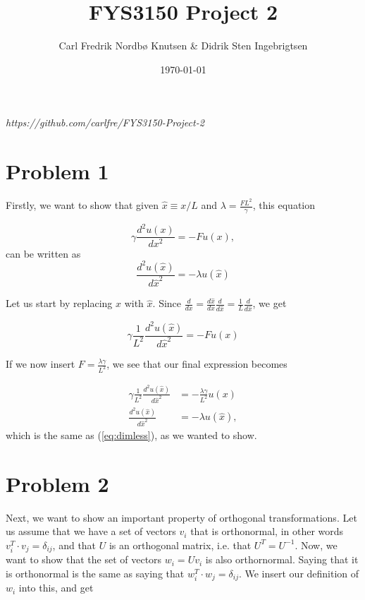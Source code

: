 \documentclass[english,notitlepage]{revtex4-1}  %
\begin{document}
\title{FYS3150 Project 2}      %
\author{Carl Fredrik Nordbø Knutsen \& Didrik Sten Ingebrigtsen}          %
\date{\today}                             %
\noaffiliation                            %


\maketitle 
    
\textit{https://github.com/carlfre/FYS3150-Project-2}
    
\section*{Problem 1}

Firstly, we want to show that given $\hat{x} \equiv x/L$ and $\lambda = \frac{FL^2}{\gamma}$, this equation

\[ \gamma \frac{d^2 u(x)}{dx^2} = -F u(x), \]
can be written as
\begin{equation}
\frac{d^2 u(\hat{x})}{d \hat{x}^2} = - \lambda u(\hat{x})
\label{eq:dimless}
\end{equation}

Let us start by replacing $x$ with $\hat{x}$. Since $\frac{d}{dx} = \frac{d \hat{x}}{dx} \frac{d}{d \hat{x}} = \frac{1}{L} \frac{d}{d \hat{x}}$, we get

\[ \gamma \frac{1}{L^2} \frac{d^2 u(\hat{x})}{d \hat{x}^2} = -F u(x) \]

If we now insert $F = \frac{\lambda \gamma}{L^2}$, we see that our final expression becomes

\begin{align*}
\gamma \frac{1}{L^2} \frac{d^2 u(\hat{x})}{d \hat{x}^2} &= -\frac{\lambda \gamma}{L^2} u(x) \\
\frac{d^2 u(\hat{x})}{d \hat{x}^2} &= - \lambda u(\hat{x}),
\end{align*}
which is the same as (\ref{eq:dimless}), as we wanted to show.

\section*{Problem 2}
Next, we want to show an important property of orthogonal transformations. Let us assume that we have a set of vectors $v_i$ that is orthonormal, in other words $v_i^T \cdot v_j = \delta_{ij}$, and that $U$ is an orthogonal matrix, i.e. that $U^T = U^{-1}$. Now, we want to show that the set of vectors $w_i = U v_i$ is also orthornormal. Saying that it is orthonormal is the same as saying that $w_i^T \cdot w_j = \delta_{ij}$. We insert our definition of $w_i$ into this, and get
\end{document}
